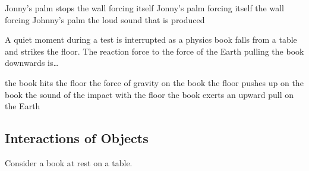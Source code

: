 \documentclass[../main-physics-problems.tex]{subfiles}
\begin{document}
\begin{questions}
\begin{randomizechoices}
    \choice Jonny's palm stops
    \choice the wall forcing itself
    \choice Jonny's palm forcing itself
    \correctchoice the wall forcing Johnny's palm
    \choice the loud sound that is produced
\end{randomizechoices}

\question
A quiet moment during a test is interrupted as a physics book falls from a table and strikes the floor.  The reaction force to the force of the Earth pulling the book downwards is\dots 

\begin{randomizechoices}
    \choice the book hits the floor
    \choice the force of gravity on the book
    \choice the floor pushes up on the book
    \choice the sound of the impact with the floor
    \correctchoice the book exerts an upward pull on the Earth
\end{randomizechoices}

\clearpage
\begin{EnvUplevel}
    \subsection{Interactions of Objects}
\end{EnvUplevel}

\question
Consider a book at rest on a table.


\begin{center}

\hspace{1cm}
\end{center}


\end{questions}
\end{document}
